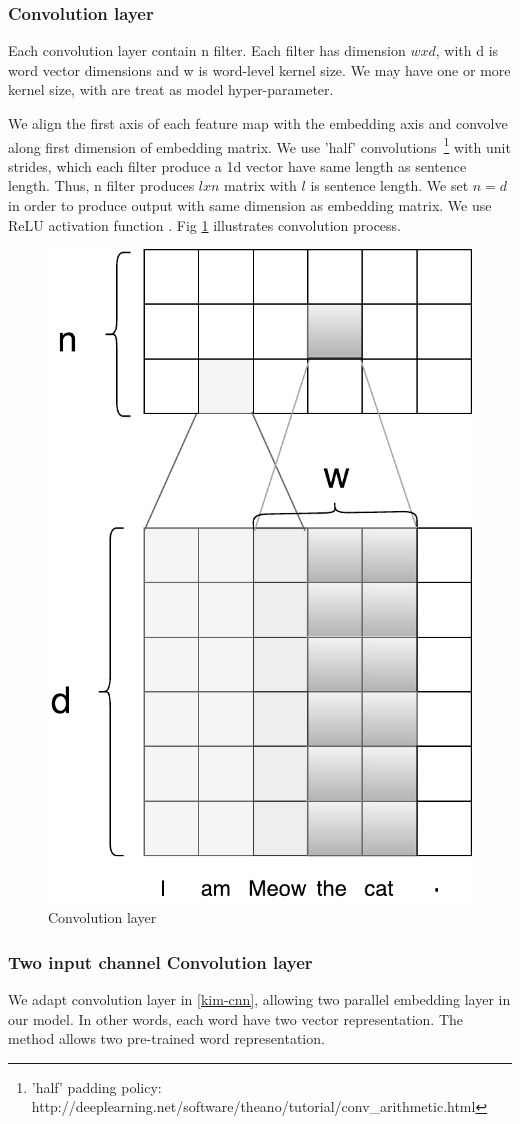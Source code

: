 \subsubsection{Convolution layer}
Each convolution layer contain n filter. Each filter has dimension $w x d$, with d is word vector dimensions and w is word-level kernel size. We may have one or more kernel size, with are treat as model hyper-parameter. 

We align the first axis of each feature map with the embedding axis and convolve along first dimension of embedding matrix. 
We use 'half' convolutions~\footnote{'half' padding policy: http://deeplearning.net/software/theano/tutorial/conv\_arithmetic.html} with unit strides, which each filter produce a 1d vector have same length as sentence length. 
Thus, n filter produces $l x n$ matrix with $l$ is sentence length. We set $n = d$ in order to produce output with same dimension as embedding matrix. We use ReLU activation function \cite{hahnloser2000digital}. Fig \ref{fig:convlayer} illustrates convolution process. 



\begin{figure}[H]
	\centering
	\includegraphics[width=0.6\linewidth]{figure/convlayer}
	\caption[Convolution layer]{Convolution layer}
	\label{fig:convlayer}
\end{figure}

\subsubsection{Two input channel Convolution layer}
We adapt convolution layer in \ref{kim-cnn}, allowing two parallel embedding layer in our model. In other words, each word have two vector representation. The method allows two pre-trained word representation. 

